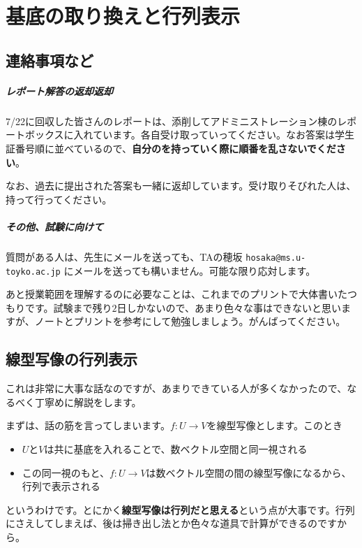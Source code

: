 \chapter{基底の取り換えと行列表示}

\section{連絡事項など}

\paragraph{レポート解答の返却返却}

7/22に回収した皆さんのレポートは、添削してアドミニストレーション棟のレポートボックスに入れています。各自受け取っていってください。なお答案は学生証番号順に並べているので、\textbf{自分のを持っていく際に順番を乱さないでください}。

なお、過去に提出された答案も一緒に返却しています。受け取りそびれた人は、持って行ってください。

\paragraph{その他、試験に向けて}

質問がある人は、先生にメールを送っても、TAの穂坂 \texttt{hosaka@ms.u-toyko.ac.jp} にメールを送っても構いません。可能な限り応対します。

あと授業範囲を理解するのに必要なことは、これまでのプリントで大体書いたつもりです。試験まで残り$2$日しかないので、あまり色々な事はできないと思いますが、ノートとプリントを参考にして勉強しましょう。がんばってください。

\section{線型写像の行列表示}

これは非常に大事な話なのですが、あまりできている人が多くなかったので、なるべく丁寧めに解説をします。

まずは、話の筋を言ってしまいます。$f\colon U\rightarrow V$を線型写像とします。このとき
\begin{itemize}
\item $U$と$V$は共に基底を入れることで、数ベクトル空間と同一視される
\item この同一視のもと、$f\colon U\rightarrow V$は数ベクトル空間の間の線型写像になるから、行列で表示される
\end{itemize}
というわけです。とにかく\textbf{線型写像は行列だと思える}という点が大事です。行列にさえしてしまえば、後は掃き出し法とか色々な道具で計算ができるのですから。

